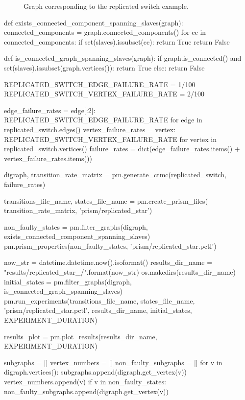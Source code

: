 \documentclass[times,a4paper,10pt,twocolumn]{article}
\theoremstyle{definition}
\theoremstyle{definition}
\theoremstyle{plain}
\begin{document}
\begin{figure}
\centering
{}
\caption{Graph corresponding to the replicated switch example.}
\label{fig:replicated-switch}
\end{figure}


\begin{sagesilent}

def exists_connected_component_spanning_slaves(graph):
    connected_components = graph.connected_components()
    for cc in connected_components:
        if set(slaves).issubset(cc):
            return True
    return False

def is_connected_graph_spanning_slaves(graph):
    if graph.is_connected() and set(slaves).issubset(graph.vertices()):
        return True
    else:
        return False

REPLICATED_SWITCH_EDGE_FAILURE_RATE = 1/100
REPLICATED_SWITCH_VERTEX_FAILURE_RATE = 2/100

edge_failure_rates = {edge[:2]: REPLICATED_SWITCH_EDGE_FAILURE_RATE
    for edge in replicated_switch.edges()}
vertex_failure_rates = {vertex: REPLICATED_SWITCH_VERTEX_FAILURE_RATE
    for vertex in replicated_switch.vertices()}
failure_rates = dict(edge_failure_rates.items() + vertex_failure_rates.items())

digraph, transition_rate_matrix = pm.generate_ctmc(replicated_switch,
    failure_rates)

transitions_file_name, states_file_name = pm.create_prism_files(
    transition_rate_matrix, 'prism/replicated_star')

non_faulty_states = pm.filter_graphs(digraph,
    exists_connected_component_spanning_slaves)
pm.prism_properties(non_faulty_states, 'prism/replicated_star.pctl')

now_str = datetime.datetime.now().isoformat()
results_dir_name = "results/replicated_star_{}/".format(now_str)
os.makedirs(results_dir_name)
initial_states = pm.filter_graphs(digraph,
    is_connected_graph_spanning_slaves)
pm.run_experiments(transitions_file_name, states_file_name,
    'prism/replicated_star.pctl', results_dir_name,
    initial_states, EXPERIMENT_DURATION)

results_plot = pm.plot_results(results_dir_name, EXPERIMENT_DURATION)

subgraphs = []
vertex_numbers = []
non_faulty_subgraphs = []
for v in digraph.vertices():
    subgraphs.append(digraph.get_vertex(v))
    vertex_numbers.append(v)
    if v in non_faulty_states:
        non_faulty_subgraphs.append(digraph.get_vertex(v))


\end{sagesilent}
\end{document}
